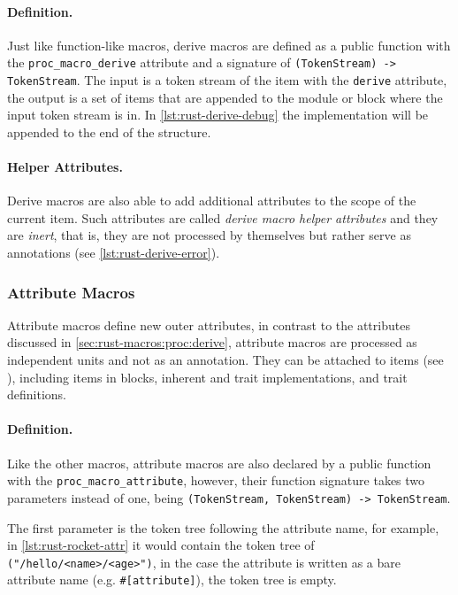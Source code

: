 \paragraph{Definition.}
Just like function-like macros,
derive macros are defined as a public function with the \texttt{proc\_macro\_derive} attribute
and a signature of \texttt{(TokenStream) -> TokenStream}.
The input is a token stream of the item with the \texttt{derive} attribute,
the output is a set of items that are appended to the module or block where the input token stream is in.
In \autoref{lst:rust-derive-debug} the  implementation will be appended to the end of the structure.

\paragraph{Helper Attributes.}
Derive macros are also able to add additional attributes to the scope of the current item.
Such attributes are called \emph{derive macro helper attributes} and they are \emph{inert},
that is, they are not processed by themselves but rather serve as annotations (see \autoref{lst:rust-derive-error}).





\subsubsection*{Attribute Macros}\label{sec:rust-macros:proc:attr}
Attribute macros define new outer attributes,
in contrast to the attributes discussed in \autoref{sec:rust-macros:proc:derive},
attribute macros are processed as independent units and not as an annotation.
They can be attached to items (see \autocite[Section 6]{RustRef2021}),
including items in  blocks, inherent and trait implementations, and trait definitions.

\paragraph{Definition.}
Like the other macros, attribute macros are also declared by a public function with the \texttt{proc\_macro\_attribute},
however, their function signature takes two parameters instead of one, being \texttt{(TokenStream, TokenStream) -> TokenStream}.

The first parameter is the token tree following the attribute name, for example, in \autoref{lst:rust-rocket-attr}
it would contain the token tree of \texttt{("/hello/<name>/<age>")},
in the case the attribute is written as a bare attribute name (e.g. \texttt{\#[attribute]}),
the token tree is empty.

